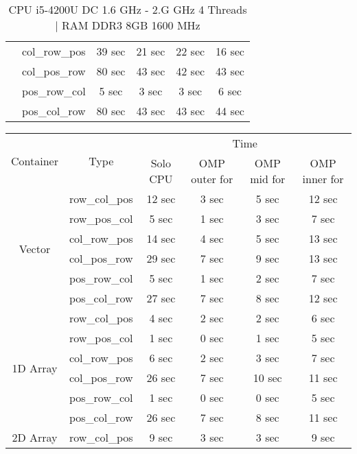 \documentclass[11pt]{article}
\begin{document}
\begin{table}[H]
\begin{tabular}{ |c|c|c|c|c|c|  }
                            & col\_row\_pos & 39 sec & 21 sec & 22 sec & 16 sec \\  
                            & col\_pos\_row & 80 sec & 43 sec & 42 sec & 43  sec \\
                            & pos\_row\_col & 5 sec & 3 sec & 3 sec & 6 sec \\
                            & pos\_col\_row & 80 sec & 43 sec & 43 sec & 44 sec \\
\hline
\end{tabular}
\caption{CPU i5-4200U DC 1.6 GHz - 2.G GHz 4 Threads $|$ RAM DDR3 8GB 1600 MHz }
\end{table}
\begin{table}[H]
\centering
\begin{tabular}{ |c|c|c|c|c|c|  }
\hline
\multirow{2}{*}{Container}  & \multirow{2}{*}{Type} & \multicolumn{4}{c|}{ Time} \\ \cline{3-6}
                            &                       &  Solo CPU& OMP outer for & OMP mid for & OMP inner for \\
\hline
\multirow{6}{*}{Vector}     & row\_col\_pos & 12 sec & 3 sec & 5 sec & 12 sec \\
                            & row\_pos\_col & 5 sec &  1 sec & 3 sec & 7 sec \\
                            & col\_row\_pos & 14 sec & 4 sec & 5 sec & 13 sec \\  
                            & col\_pos\_row & 29 sec & 7 sec & 9 sec & 13 sec \\
                            & pos\_row\_col & 5 sec & 1 sec & 2 sec & 7 sec \\
                            & pos\_col\_row & 27 sec & 7 sec & 8 sec & 12 sec \\
\hline
\multirow{6}{*}{1D Array}   & row\_col\_pos & 4 sec & 2 sec & 2 sec & 6 sec \\
                            & row\_pos\_col & 1 sec & 0 sec & 1 sec & 5 sec \\
                            & col\_row\_pos & 6 sec & 2 sec & 3 sec & 7 sec \\  
                            & col\_pos\_row & 26 sec & 7 sec & 10 sec & 11 sec \\
                            & pos\_row\_col & 1 sec & 0 sec & 0 sec & 5 sec \\
                            & pos\_col\_row & 26 sec & 7 sec & 8 sec & 11 sec \\
\hline
\multirow{6}{*}{2D Array}   & row\_col\_pos & 9 sec & 3 sec & 3 sec & 9 sec \\

\end{tabular}
\end{table}
\end{document}
